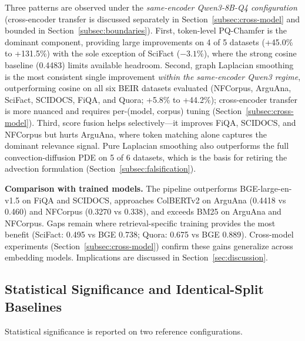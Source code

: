 \documentclass[review,1p]{elsarticle}
\begin{document}
Three patterns are observed under the \emph{same-encoder Qwen3-8B-Q4 configuration} (cross-encoder transfer is discussed separately in Section~\ref{subsec:cross-model} and bounded in Section~\ref{subsec:boundaries}). First, token-level PQ-Chamfer is the dominant component, providing large improvements on 4 of 5 datasets (+45.0\% to +131.5\%) with the sole exception of SciFact ($-3.1\%$), where the strong cosine baseline (0.4483) limits available headroom. Second, graph Laplacian smoothing is the most consistent single improvement \emph{within the same-encoder Qwen3 regime}, outperforming cosine on all six BEIR datasets evaluated (NFCorpus, ArguAna, SciFact, SCIDOCS, FiQA, and Quora; +5.8\% to +44.2\%); cross-encoder transfer is more nuanced and requires per-(model, corpus) tuning (Section~\ref{subsec:cross-model}). Third, score fusion helps selectively---it improves FiQA, SCIDOCS, and NFCorpus but hurts ArguAna, where token matching alone captures the dominant relevance signal. Pure Laplacian smoothing also outperforms the full convection-diffusion PDE on 5 of 6 datasets, which is the basis for retiring the advection formulation (Section~\ref{subsec:falsification}).

\textbf{Comparison with trained models.} The pipeline outperforms BGE-large-en-v1.5 on FiQA and SCIDOCS, approaches ColBERTv2 on ArguAna (0.4418 vs 0.460) and NFCorpus (0.3270 vs 0.338), and exceeds BM25 on ArguAna and NFCorpus. Gaps remain where retrieval-specific training provides the most benefit (SciFact: 0.495 vs BGE 0.738; Quora: 0.675 vs BGE 0.889). Cross-model experiments (Section~\ref{subsec:cross-model}) confirm these gains generalize across embedding models. Implications are discussed in Section~\ref{sec:discussion}.


\subsection{Statistical Significance and Identical-Split Baselines}\label{subsec:significance}
Statistical significance is reported on two reference configurations.
\end{document}
